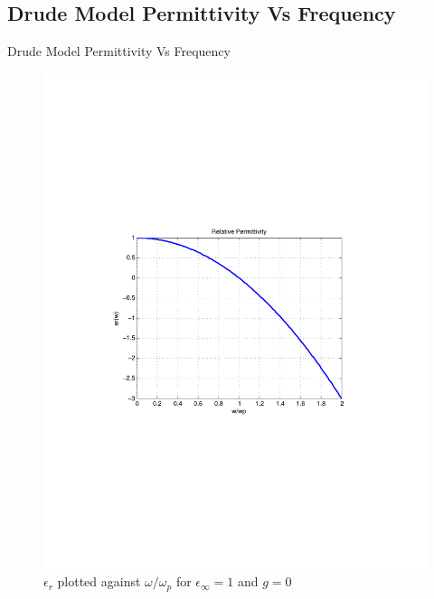 \documentclass{beamer}
\begin{document}
\subsection{Drude Model Permittivity Vs Frequency}
\begin{frame}{Drude Model Permittivity Vs Frequency}
\begin{figure}[H]
\centering
\vspace{-0.35cm}
\includegraphics[scale=0.525, trim=4cm 8.5cm 4cm 8.5cm, clip]{Figures/FigCh03_DrudeModel_er.pdf}
\vspace{-0.5cm}
\caption{{\tiny $\epsilon_r$ plotted against $\omega/\omega_p$ for $\epsilon_\infty=1$ and $g=0$}}
\label{DrudeModel_er}
\end{figure}
\end{frame}
\end{document}

